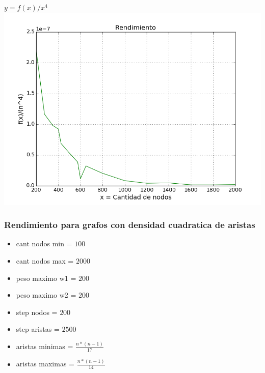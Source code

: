 \begin{center}
	\textbf{$y = f(x)/x^4$}\\
	\includegraphics[scale=0.7]{experimentos/bqlocal/rendimiento_aristas_lineales/complexity_med_over_n_fourth.png}
\end{center}

\subsubsection{Rendimiento para grafos con densidad cuadratica de aristas}
\begin{itemize}
	\item cant nodos min = $100$
	\item cant nodos max = $2000$
	\item peso maximo w1 = $200$
	\item peso maximo w2 = $200$
	\item step nodos = $200$
	\item step aristas = $2500$
	\item aristas minimas = $\frac{n*(n-1)}{17}$
	\item aristas maximas = $\frac{n*(n-1)}{14}$
\end{itemize}								

